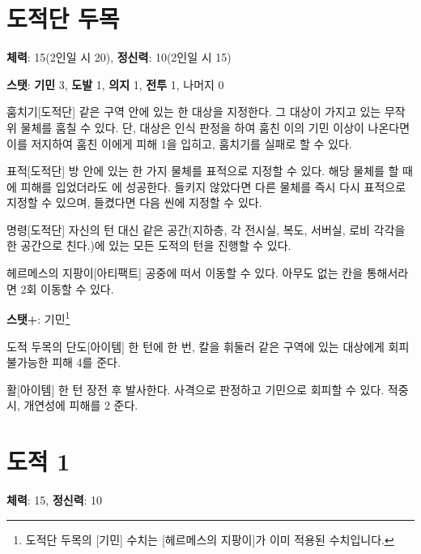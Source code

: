 \documentclass{report}
\begin{document}
	\section*{도적단 두목}
	\textbf{체력}: 15(2인일 시 20), \textbf{정신력}: 10(2인일 시 15)
	
	\textbf{스탯}: \textbf{기민} 3, \textbf{도발} 1, \textbf{의지} 1, \textbf{전투} 1, 나머지 0
	
	\begin{spoiler}{훔치기}{[도적단]}
		같은 구역 안에 있는 한 대상을 지정한다. 그 대상이 가지고 있는 무작위 물체를 훔칠 수 있다. 단, 대상은 인식 판정을 하여 훔친 이의 기민 이상이 나온다면 이를 저지하여 훔친 이에게 피해 1을 입히고, 훔치기를 실패로 할 수 있다.
	\end{spoiler}
	
	\begin{spoiler}{표적}{[도적단]}
		방 안에 있는 한 가지 물체를 표적으로 지정할 수 있다. 해당 물체를  할 때에 피해를 입었더라도 에 성공한다. 들키지 않았다면 다른 물체를 즉시 다시 표적으로 지정할 수 있으며, 들켰다면 다음 씬에 지정할 수 있다.
	\end{spoiler}
	
	\begin{spoiler}{명령}{[도적단]}
		자신의 턴 대신 같은 공간(지하층, 각 전시실, 복도, 서버실, 로비 각각을 한 공간으로 친다.)에 있는 모든 도적의 턴을 진행할 수 있다.
	\end{spoiler}
	
	\begin{spoiler}{헤르메스의 지팡이}{[아티팩트]}
		공중에 떠서 이동할 수 있다. 아무도 없는 칸을 통해서라면 2회 이동할 수 있다.
		
		\textbf{스탯+}: 기민\footnote{도적단 두목의 [기민] 수치는 [헤르메스의 지팡이]가 이미 적용된 수치입니다.}
	\end{spoiler}
	
	\begin{spoiler}{도적 두목의 단도}{[아이템]}
		한 턴에 한 번, 칼을 휘둘러 같은 구역에 있는 대상에게 회피 불가능한 피해 4를 준다.
	\end{spoiler}
	
	\begin{spoiler}{활}{[아이템]}
		한 턴 장전 후 발사한다. 사격으로 판정하고 기민으로 회피할 수 있다. 적중시, 개연성에 피해를 2 준다.
	\end{spoiler}
	
	\section*{도적 1}
	\textbf{체력}: 15, \textbf{정신력}: 10
	
\end{document}
